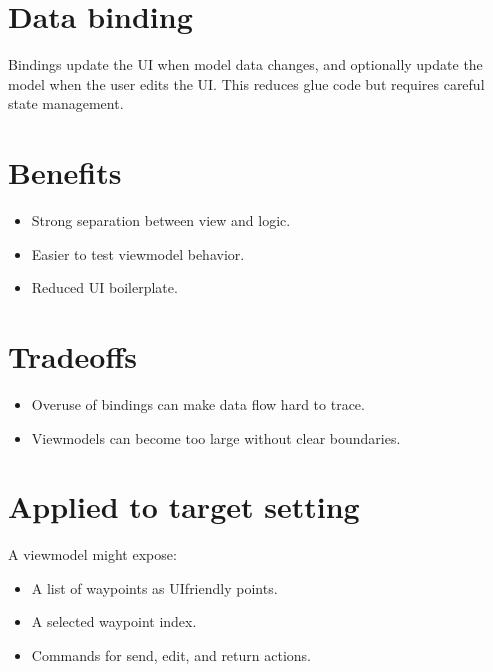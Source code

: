 \documentclass[letterpaper,10pt,english]{sphinxmanual}
\begin{document}
\section{Data binding}
\label{\detokenize{appendix_c_mvvm_architecture:data-binding}}
\sphinxAtStartPar
Bindings update the UI when model data changes, and optionally update the model
when the user edits the UI. This reduces glue code but requires careful state
management.


\section{Benefits}
\label{\detokenize{appendix_c_mvvm_architecture:benefits}}\begin{itemize}
\item {} 
\sphinxAtStartPar
Strong separation between view and logic.

\item {} 
\sphinxAtStartPar
Easier to test view\sphinxhyphen{}model behavior.

\item {} 
\sphinxAtStartPar
Reduced UI boilerplate.

\end{itemize}


\section{Tradeoffs}
\label{\detokenize{appendix_c_mvvm_architecture:tradeoffs}}\begin{itemize}
\item {} 
\sphinxAtStartPar
Overuse of bindings can make data flow hard to trace.

\item {} 
\sphinxAtStartPar
View\sphinxhyphen{}models can become too large without clear boundaries.

\end{itemize}


\section{Applied to target setting}
\label{\detokenize{appendix_c_mvvm_architecture:applied-to-target-setting}}
\sphinxAtStartPar
A view\sphinxhyphen{}model might expose:
\begin{itemize}
\item {} 
\sphinxAtStartPar
A list of waypoints as UI\sphinxhyphen{}friendly points.

\item {} 
\sphinxAtStartPar
A selected waypoint index.

\item {} 
\sphinxAtStartPar
Commands for send, edit, and return actions.

\end{itemize}
\end{document}
